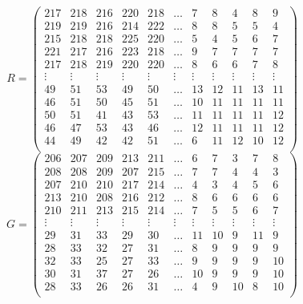 \documentclass[varwidth]{standalone}
\begin{document}
\[
R = \begin{pmatrix}
217 & 218 & 216 & 220 & 218 & \dots & 7 & 8 & 4 & 8 & 9 \\
219 & 219 & 216 & 214 & 222 & \dots & 8 & 8 & 5 & 5 & 4 \\
215 & 218 & 218 & 225 & 220 & \dots & 5 & 4 & 5 & 6 & 7 \\
221 & 217 & 216 & 223 & 218 & \dots & 9 & 7 & 7 & 7 & 7 \\
217 & 218 & 219 & 220 & 220 & \dots & 8 & 6 & 6 & 7 & 8 \\
\vdots & \vdots & \vdots & \vdots & \vdots & \vdots & \vdots & \vdots & \vdots & \vdots & \vdots \\
49 & 51 & 53 & 49 & 50 & \dots & 13 & 12 & 11 & 13 & 11 \\
46 & 51 & 50 & 45 & 51 & \dots & 10 & 11 & 11 & 11 & 11 \\
50 & 51 & 41 & 43 & 53 & \dots & 11 & 11 & 11 & 11 & 12 \\
46 & 47 & 53 & 43 & 46 & \dots & 12 & 11 & 11 & 11 & 12 \\
44 & 49 & 42 & 42 & 51 & \dots & 6 & 11 & 12 & 10 & 12 \\
\end{pmatrix}
\]
\[
G = \begin{pmatrix}
206 & 207 & 209 & 213 & 211 & \dots & 6 & 7 & 3 & 7 & 8 \\
208 & 208 & 209 & 207 & 215 & \dots & 7 & 7 & 4 & 4 & 3 \\
207 & 210 & 210 & 217 & 214 & \dots & 4 & 3 & 4 & 5 & 6 \\
213 & 210 & 208 & 216 & 212 & \dots & 8 & 6 & 6 & 6 & 6 \\
210 & 211 & 213 & 215 & 214 & \dots & 7 & 5 & 5 & 6 & 7 \\
\vdots & \vdots & \vdots & \vdots & \vdots & \vdots & \vdots & \vdots & \vdots & \vdots & \vdots \\
29 & 31 & 33 & 29 & 30 & \dots & 11 & 10 & 9 & 11 & 9 \\
28 & 33 & 32 & 27 & 31 & \dots & 8 & 9 & 9 & 9 & 9 \\
32 & 33 & 25 & 27 & 33 & \dots & 9 & 9 & 9 & 9 & 10 \\
30 & 31 & 37 & 27 & 26 & \dots & 10 & 9 & 9 & 9 & 10 \\
28 & 33 & 26 & 26 & 31 & \dots & 4 & 9 & 10 & 8 & 10 \\
\end{pmatrix}
\]
\end{document}
